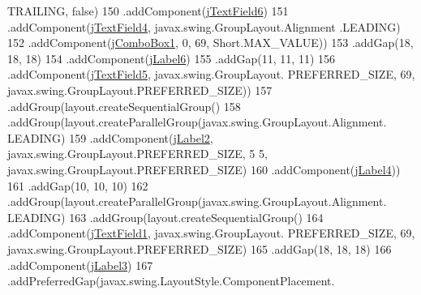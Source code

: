 \begin{DoxyCode}
      TRAILING, \textcolor{keyword}{false})
150                                     .addComponent(\mbox{\hyperlink{class_interfaz_package_1_1_consulta_busqueda_a98f9196a81f18bfd45672e1c4605d68a}{jTextField6}})
151                                     .addComponent(\mbox{\hyperlink{class_interfaz_package_1_1_consulta_busqueda_a1955bd4179b98e109c23fb701af55b5d}{jTextField4}}, javax.swing.GroupLayout.Alignment
      .LEADING)
152                                     .addComponent(\mbox{\hyperlink{class_interfaz_package_1_1_consulta_busqueda_ab0737507a855f158ca16439d3df67b4e}{jComboBox1}}, 0, 69, Short.MAX\_VALUE))
153                                 .addGap(18, 18, 18)
154                                 .addComponent(\mbox{\hyperlink{class_interfaz_package_1_1_consulta_busqueda_ab5f2ed2b4cd6da7ed4e68ab08caabf65}{jLabel6}})
155                                 .addGap(11, 11, 11)
156                                 .addComponent(\mbox{\hyperlink{class_interfaz_package_1_1_consulta_busqueda_a62b77207a9f1d648087f776c36b92c4a}{jTextField5}}, javax.swing.GroupLayout.
      PREFERRED\_SIZE, 69, javax.swing.GroupLayout.PREFERRED\_SIZE))
157                             .addGroup(layout.createSequentialGroup()
158                                 .addGroup(layout.createParallelGroup(javax.swing.GroupLayout.Alignment.
      LEADING)
159                                     .addComponent(\mbox{\hyperlink{class_interfaz_package_1_1_consulta_busqueda_a875cc70442f93c7e077251d0fb0f30f9}{jLabel2}}, javax.swing.GroupLayout.PREFERRED\_SIZE, 5
      5, javax.swing.GroupLayout.PREFERRED\_SIZE)
160                                     .addComponent(\mbox{\hyperlink{class_interfaz_package_1_1_consulta_busqueda_a2b841f08ba3d614049012b4b67130909}{jLabel4}}))
161                                 .addGap(10, 10, 10)
162                                 .addGroup(layout.createParallelGroup(javax.swing.GroupLayout.Alignment.
      LEADING)
163                                     .addGroup(layout.createSequentialGroup()
164                                         .addComponent(\mbox{\hyperlink{class_interfaz_package_1_1_consulta_busqueda_a268df17df2147b480825a6af3128683e}{jTextField1}}, javax.swing.GroupLayout.
      PREFERRED\_SIZE, 69, javax.swing.GroupLayout.PREFERRED\_SIZE)
165                                         .addGap(18, 18, 18)
166                                         .addComponent(\mbox{\hyperlink{class_interfaz_package_1_1_consulta_busqueda_ac2ce384e0d5b1405b8a3cfec2683a020}{jLabel3}})
167                                         .addPreferredGap(javax.swing.LayoutStyle.ComponentPlacement.

\end{DoxyCode}
